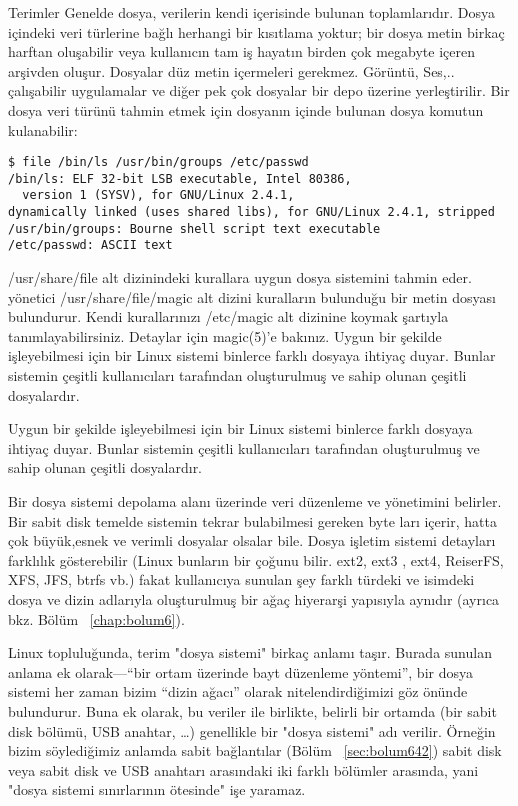 \begin{section}{Terimler}
Genelde dosya, verilerin kendi içerisinde bulunan toplamlarıdır. Dosya içindeki veri türlerine bağlı herhangi bir kısıtlama yoktur; bir dosya metin birkaç harftan oluşabilir veya kullanıcın tam iş hayatın birden çok megabyte içeren arşivden oluşur. Dosyalar düz metin içermeleri gerekmez. Görüntü, Ses,.. çalışabilir uygulamalar ve diğer pek çok dosyalar bir depo üzerine yerleştirilir. Bir dosya veri türünü tahmin etmek için dosyanın içinde bulunan dosya komutun kulanabilir:

\begin{verbatim}
$ file /bin/ls /usr/bin/groups /etc/passwd
/bin/ls: ELF 32-bit LSB executable, Intel 80386,
  version 1 (SYSV), for GNU/Linux 2.4.1,
dynamically linked (uses shared libs), for GNU/Linux 2.4.1, stripped
/usr/bin/groups: Bourne shell script text executable
/etc/passwd: ASCII text
\end{verbatim}

/usr/share/file alt dizinindeki kurallara uygun dosya sistemini tahmin eder.
yönetici /usr/share/file/magic alt dizini kuralların bulunduğu bir metin dosyası
bulundurur. Kendi kurallarınızı /etc/magic alt dizinine koymak şartıyla
tanımlayabilirsiniz. Detaylar için magic(5)'e bakınız. Uygun bir şekilde işleyebilmesi için bir Linux sistemi binlerce farklı dosyaya ihtiyaç duyar. Bunlar sistemin çeşitli kullanıcıları tarafından oluşturulmuş ve sahip olunan çeşitli
dosyalardır.

Uygun bir şekilde işleyebilmesi için bir Linux sistemi binlerce farklı dosyaya ihtiyaç duyar. Bunlar sistemin çeşitli kullanıcıları tarafından oluşturulmuş ve sahip olunan çeşitli dosyalardır.

Bir dosya sistemi depolama alanı üzerinde veri düzenleme ve yönetimini belirler. Bir sabit disk temelde sistemin tekrar bulabilmesi gereken byte ları içerir, hatta çok büyük,esnek ve verimli dosyalar olsalar bile. Dosya işletim sistemi detayları farklılık gösterebilir (Linux bunların bir çoğunu bilir. ext2, ext3 , ext4, ReiserFS, XFS, JFS, btrfs vb.) fakat kullanıcıya sunulan şey farklı türdeki ve isimdeki dosya ve dizin adlarıyla oluşturulmuş bir ağaç hiyerarşi yapısıyla aynıdır (ayrıca bkz. Bölüm ~\ref{chap:bolum6}).

Linux topluluğunda, terim "dosya sistemi" birkaç anlamı taşır. Burada sunulan anlama ek olarak—“bir ortam üzerinde bayt düzenleme yöntemi”, bir dosya sistemi her zaman bizim “dizin ağacı” olarak nitelendirdiğimizi göz önünde bulundurur. Buna ek olarak, bu veriler ile birlikte, belirli bir ortamda (bir sabit disk bölümü, USB anahtar, \ldots) genellikle bir "dosya sistemi" adı verilir. Örneğin bizim söylediğimiz anlamda sabit bağlantılar (Bölüm ~\ref{sec:bolum642}) sabit disk veya sabit disk ve USB anahtarı arasındaki iki farklı bölümler arasında, yani "dosya sistemi sınırlarının ötesinde" işe yaramaz.
\end{section}
